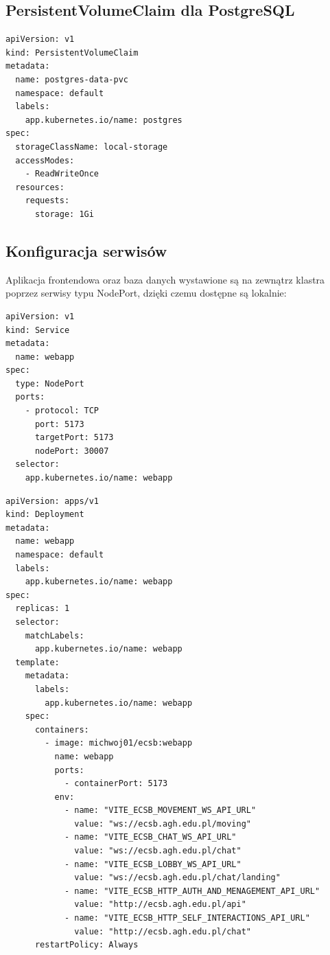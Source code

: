 \documentclass[polish]{aghengthesis}
\begin{document}
\subsection{PersistentVolumeClaim dla PostgreSQL}

\begin{lstlisting}[caption=PersistentVolumeClaim dla PostgreSQL]
apiVersion: v1
kind: PersistentVolumeClaim
metadata:
  name: postgres-data-pvc
  namespace: default
  labels:
    app.kubernetes.io/name: postgres
spec:
  storageClassName: local-storage
  accessModes:
    - ReadWriteOnce
  resources:
    requests:
      storage: 1Gi
\end{lstlisting}
\newpage

\subsection{Konfiguracja serwisów}

Aplikacja frontendowa oraz baza danych wystawione są na zewnątrz klastra poprzez serwisy typu NodePort, dzięki czemu dostępne są lokalnie:
\begin{lstlisting}[caption=Konfiguracja serwisu webapp]
apiVersion: v1
kind: Service
metadata:
  name: webapp
spec:
  type: NodePort
  ports:
    - protocol: TCP
      port: 5173
      targetPort: 5173
      nodePort: 30007
  selector:
    app.kubernetes.io/name: webapp
\end{lstlisting}
\begin{lstlisting}[caption=Konfiguracja podów webapp]
apiVersion: apps/v1
kind: Deployment
metadata:
  name: webapp
  namespace: default
  labels:
    app.kubernetes.io/name: webapp
spec:
  replicas: 1
  selector:
    matchLabels:
      app.kubernetes.io/name: webapp
  template:
    metadata:
      labels:
        app.kubernetes.io/name: webapp
    spec:
      containers:
        - image: michwoj01/ecsb:webapp
          name: webapp
          ports:
            - containerPort: 5173
          env:
            - name: "VITE_ECSB_MOVEMENT_WS_API_URL"
              value: "ws://ecsb.agh.edu.pl/moving"
            - name: "VITE_ECSB_CHAT_WS_API_URL"
              value: "ws://ecsb.agh.edu.pl/chat"
            - name: "VITE_ECSB_LOBBY_WS_API_URL"
              value: "ws://ecsb.agh.edu.pl/chat/landing"
            - name: "VITE_ECSB_HTTP_AUTH_AND_MENAGEMENT_API_URL"
              value: "http://ecsb.agh.edu.pl/api"
            - name: "VITE_ECSB_HTTP_SELF_INTERACTIONS_API_URL"
              value: "http://ecsb.agh.edu.pl/chat"
      restartPolicy: Always
\end{lstlisting}
\end{document}
